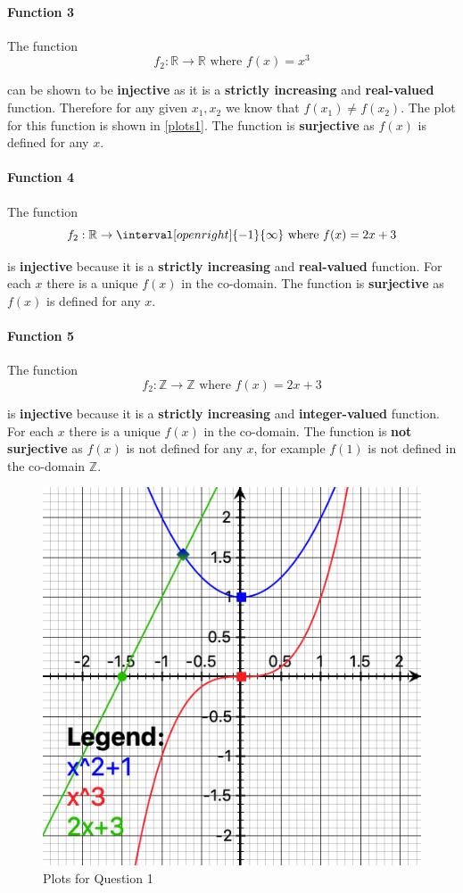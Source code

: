 \paragraph{Function 3} The function 
\[
  f_2: \mathbb{R} \rightarrow \mathbb{R} \text{ where } f(x) = x^3
\]

can be shown to be \textbf{injective} as it is a \textbf{strictly increasing} and \textbf{real-valued} function. Therefore for any given \( x_1, x_2 \) we know that \( f(x_1) \neq f(x_2) \). The plot for this function is shown in \autoref{plots1}. The function is \textbf{surjective} as \( f(x) \) is defined for any \( x \).

\paragraph{Function 4} The function \[
  f_2: \mathbb{R} \rightarrow \interval[open right]{-1}{\infty} \text{ where } f(x) = 2x + 3
\]

is \textbf{injective} because it is a \textbf{strictly increasing} and \textbf{real-valued} function. For each \( x \) there is a unique \( f(x) \) in the co-domain. The function is \textbf{surjective} as \( f(x) \) is defined for any \( x \).

\paragraph{Function 5} The function \[
  f_2: \mathbb{Z} \rightarrow \mathbb{Z} \text{ where } f(x) = 2x + 3
\]

is \textbf{injective} because it is a \textbf{strictly increasing} and \textbf{integer-valued} function. For each \( x \) there is a unique \( f(x) \) in the co-domain. The function is \textbf{not surjective} as \( f(x) \) is not defined for any \( x \), for example \( f(1) \) is not defined in the co-domain \( \mathbb{Z} \). 

\begin{figure}[h]
  \centering
  \caption{Plots for Question 1}\label{plots1}
  \includegraphics[]{plots.png}
\end{figure}


